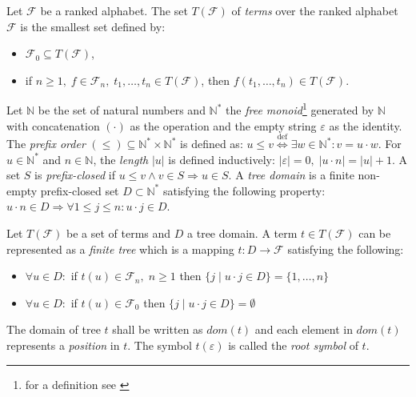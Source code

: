 \begin{defn}
Let $\mathcal{F}$ be a ranked alphabet. The set $T(\mathcal{F})$ of \emph{terms} over the ranked alphabet $\mathcal{F}$ is the smallest set defined by:
\begin{itemize}
    \item $\mathcal{F}_0 \subseteq T(\mathcal{F})$,
    \item if $n \geq 1, \; f \in \mathcal{F}_n, \; t_1,\dots, t_n \in T(\mathcal{F})$, then $f(t_1,\dots, t_n) \in T(\mathcal{F})$.
\end{itemize}
\end{defn}

\begin{defn}
Let $\mathbb{N}$ be the set of natural numbers and $\mathbb{N}^*$ the \emph{free monoid}\footnote{for a definition see \cite{Lothaire83}} generated by $\mathbb{N}$ with concatenation $(\cdot)$ as the operation and the empty string $\varepsilon$ as the identity. The \emph{prefix order} $(\leq) \subseteq \mathbb{N}^* \times \mathbb{N}^*$ is defined as: $u \leq v \overset{\text{def}}{\Longleftrightarrow} \exists w \in \mathbb{N}^*: v = u \cdot w$. For $u \in \mathbb{N}^*$ and $n \in \mathbb{N}$, the \emph{length} $|u|$ is defined inductively: $|\varepsilon| = 0, \; |u \cdot n| = |u| + 1$. A set $S$ is \emph{prefix-closed} if $u \leq v \wedge v \in S \Rightarrow u \in S$. A \emph{tree domain} is a finite non-empty prefix-closed set $D \subset \mathbb{N}^*$ satisfying the following property: $u \cdot n \in D \Rightarrow \forall 1 \leq j \leq n: u \cdot j \in D$.
\end{defn}

\begin{defn}
Let $T(\mathcal{F})$ be a set of terms and $D$ a tree domain. A term $t \in T(\mathcal{F})$ can be represented as a \emph{finite tree} which is a mapping $t: D \rightarrow \mathcal{F}$ satisfying the following:
\begin{itemize}
    \item $\forall u \in D:$ if $t(u) \in \mathcal{F}_n, \; n \geq 1$ then $\{j \; | \; u \cdot j \in D\} = \{1, \dots, n\}$
    \item $\forall u \in D:$ if $t(u) \in \mathcal{F}_0$ then $\{j \; | \; u \cdot j \in D\} = \emptyset$
\end{itemize}
The domain of tree $t$ shall be written as $dom(t)$ and each element in $dom(t)$ represents a \emph{position} in $t$. The symbol $t(\varepsilon)$ is called the \emph{root symbol} of $t$.
\end{defn}

